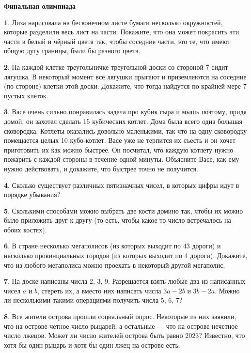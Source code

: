 \documentclass[b5paper,usehyperref, twoside]{article}
\theoremstyle{definition}
\theoremstyle{definition}
\newtheorem{Task}{}
\begin{document}
\large
	

\begin{center}
\textbf{Финальная олимпиада}
\end{center}


\begin{Task}
	 Лиза нарисовала на бесконечном листе бумаги несколько окружностей, которые разделили весь лист на части. Покажите, что она может покрасить эти части в белый и чёрный цвета так, чтобы соседние части, это те, что имеют общую дугу границы, были бы разного цвета.
\end{Task}


\begin{Task}
	На каждой клетке-треугольничке треугольной доски со стороной 7 сидит лягушка. В некоторый момент все лягушки прыгают и приземляются на соседние (по стороне) клетки этой доски. Докажите, что тогда найдутся по крайней мере 7 пустых клеток.
\end{Task}

\begin{Task}
	Васе очень сильно понравилась задача про кубик сыра и мышь поэтому, придя домой, он захотел сделать 15 кубических котлет. Дома была всего одна большая сковородка. Котлеты оказались довольно маленькими, так что на одну сковородку помещается целых 10 кубо-котлет. Васе уже не терпится их съесть и он хочет приготовить их как можно быстрее. Он посчитал, что каждую котлету нужно пожарить с каждой стороны в течение одной минуты. Объясните Васе, как ему нужно действовать, и докажите, что быстрее точно не получится.
\end{Task}

\begin{Task}
	Сколько существует различных пятизначных чисел, в которых цифры идут в порядке убывания?
\end{Task}

\begin{Task}
	Сколькими способами можно выбрать две кости домино так, чтобы их можно было приложить друг к другу (то есть, чтобы какое-то число встречалось на обоих костях).
\end{Task}

\begin{Task}
	В стране несколько мегаполисов (из которых выходит по 43 дороги) и несколько провинциальных городов (из которых выходит по 4 дороги). Докажите, что из любого мегаполиса можно проехать в некоторый другой мегаполис.
\end{Task}

\begin{Task}
	На доске написаны числа 2, 3, 9. Разрешается взять любые два из написанных чисел $a$ и $b$, стереть их, а вместо них написать числа $3a-2b$ и $3b-2a$. Можно ли несколькими такими операциями получить числа 5, 6, 7?
\end{Task}


\begin{Task}
	Все жители острова прошли социальный опрос. Некоторые из них заявили, что на острове четное число рыцарей, а остальные — что на острове нечетное число лжецов. Может ли число жителей острова быть равно $2023$? Известно, что хотя бы один рыцарь и хотя бы один лжец на острове есть.
\end{Task}
\end{document}
